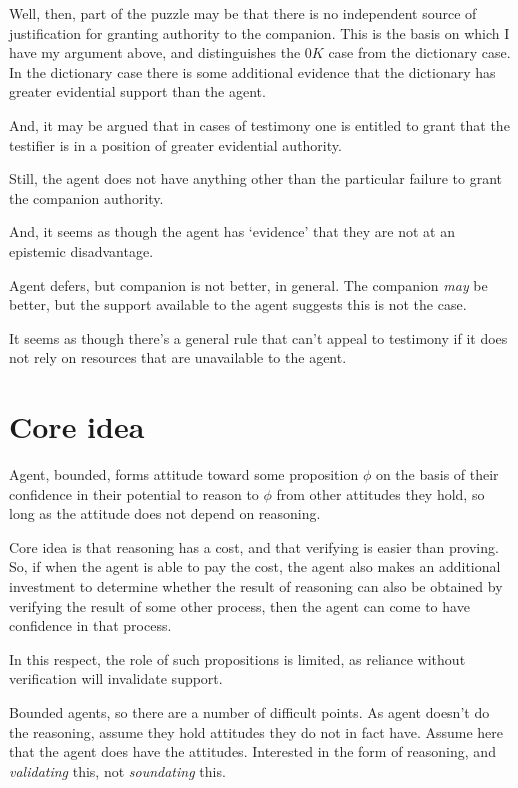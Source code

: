 \documentclass[10pt]{article}
\begin{document}
Well, then, part of the puzzle may be that there is no independent source of justification for granting authority to the companion.
This is the basis on which I have my argument above, and distinguishes the \(0K\) case from the dictionary case.
In the dictionary case there is some additional evidence that the dictionary has greater evidential support than the agent.

And, it may be argued that in cases of testimony one is entitled to grant that the testifier is in a position of greater evidential authority.

Still, the agent does not have anything other than the particular failure to grant the companion authority.

And, it seems as though the agent has `evidence' that they are not at an epistemic disadvantage.

Agent defers, but companion is not better, in general.
The companion \emph{may} be better, but the support available to the agent suggests this is not the case.

It seems as though there's a general rule that can't appeal to testimony if it does not rely on resources that are unavailable to the agent.



\section{Core idea}
\label{sec:core-idea}


Agent, bounded, forms attitude toward some proposition \(\phi\) on the basis of their confidence in their potential to reason to \(\phi\) from other attitudes they hold, so long as the attitude does not depend on reasoning.

Core idea is that reasoning has a cost, and that verifying is easier than proving.
So, if when the agent is able to pay the cost, the agent also makes an additional investment to determine whether the result of reasoning can also be obtained by verifying the result of some other process, then the agent can come to have confidence in that process.

In this respect, the role of such propositions is limited, as reliance without verification will invalidate support.

Bounded agents, so there are a number of difficult points.
As agent doesn't do the reasoning, assume they hold attitudes they do not in fact have.
Assume here that the agent does have the attitudes.
Interested in the form of reasoning, and \emph{validating} this, not \emph{soundating} this.
\end{document}
